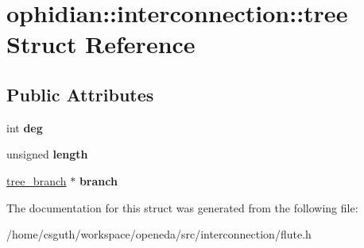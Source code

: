 \hypertarget{structophidian_1_1interconnection_1_1tree}{\section{ophidian\-:\-:interconnection\-:\-:tree Struct Reference}
\label{structophidian_1_1interconnection_1_1tree}
}
\subsection*{Public Attributes}
\begin{DoxyCompactItemize}
\item 
\hypertarget{structophidian_1_1interconnection_1_1tree_a5a83b4cd9026c954806e5ef76955f58a}{int {\bfseries deg}}\label{structophidian_1_1interconnection_1_1tree_a5a83b4cd9026c954806e5ef76955f58a}

\item 
\hypertarget{structophidian_1_1interconnection_1_1tree_a7930eab96660246aa70fcf9e26c2b203}{unsigned {\bfseries length}}\label{structophidian_1_1interconnection_1_1tree_a7930eab96660246aa70fcf9e26c2b203}

\item 
\hypertarget{structophidian_1_1interconnection_1_1tree_ad74447a3f65a5ec228a976da7ed955e2}{\hyperlink{structophidian_1_1interconnection_1_1tree__branch}{tree\-\_\-branch} $\ast$ {\bfseries branch}}\label{structophidian_1_1interconnection_1_1tree_ad74447a3f65a5ec228a976da7ed955e2}

\end{DoxyCompactItemize}


The documentation for this struct was generated from the following file\-:\begin{DoxyCompactItemize}
\item 
/home/csguth/workspace/openeda/src/interconnection/flute.\-h\end{DoxyCompactItemize}
